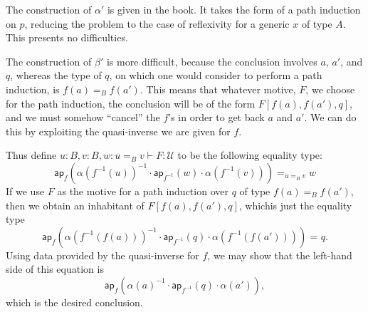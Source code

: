 \documentclass{article}
\newcommand{\idty}[3]{{#2}\mathbin{=_{#1}}{#3}}
\newcommand{\app}[2]{{#1}({#2})}
\newcommand{\apppath}[1]{\mathsf{ap}_{#1}}
\newcommand{\univty}{\mathcal{U}}
\newcommand{\inverse}[1]{#1^{-1}}
\newcommand{\concat}[2]{{#1}\cdot{#2}}
\begin{document}
The construction of $\alpha'$ is given in the book.  It takes the form of a path induction on $p$, reducing the problem to the case of reflexivity for a generic $x$ of type $A$.  This presents no difficulties.

The construction of $\beta'$ is more difficult, because the conclusion involves $a$, $a'$, and $q$, whereas the type of $q$, on which one would consider to perform a path induction, is $\idty{B}{\app{f}{a}}{\app{f}{a'}}$.  This means that whatever motive, $F$, we choose for the path induction, the conclusion will be of the form $F[\app{f}{a},\app{f}{a'},q]$, and we must somehow ``cancel'' the $f$'s in order to get back $a$ and $a'$.  We can do this by exploiting the quasi-inverse we are given for $f$.

Thus define $u:B,v:B,w:\idty{B}{u}{v}\vdash F:\univty$ to be the following equality type:
\begin{displaymath}
  \idty{\idty{B}{u}{v}}{\app{\apppath{f}}{\concat{\concat{\inverse{\app{\alpha}{\app{\inverse{f}}{u}}}}{\app{\apppath{\inverse{f}}}{w}}}{\app{\alpha}{\app{\inverse{f}}{v}}}}}{w}
\end{displaymath}
If we use $F$ as the motive for a path induction over $q$ of type $\idty{B}{\app{f}{a}}{\app{f}{a'}}$, then we obtain an inhabitant of ${F[\app{f}{a},\app{f}{a'},q]}$, whichis just the equality type
\begin{displaymath}
  \idty{}
  {\app{\apppath{f}}{\concat{\concat{\inverse{\app{\alpha}{\app{\inverse{f}}{\app{f}{a}}}}}{\app{\apppath{\inverse{f}}}{q}}}{\app{\alpha}{\app{\inverse{f}}{\app{f}{a'}}}}}}
  {q}.
\end{displaymath}
Using data provided by the quasi-inverse for $f$, we may show that the left-hand side of this equation is
\begin{displaymath}
  \app{\apppath{f}}{\concat{\concat{\inverse{\app{\alpha}{a}}}{\app{\apppath{\inverse{f}}}{q}}}{\app{\alpha}{a'}}},
\end{displaymath}
which is the desired conclusion.
\end{document}
